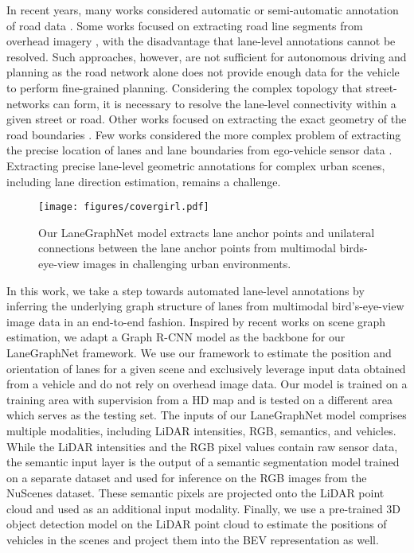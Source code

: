 \documentclass[letterpaper, 10 pt, conference]{ieeeconf}
\begin{document}
In recent years, many works considered automatic or semi-automatic annotation of road data \cite{bastani2018roadtracer, batra2019improved, mattyus2017deeproadmapper, tan2020vecroad}. Some works focused on extracting road line segments from overhead imagery \cite{batra2019improved,he2020sat2graph,tan2020vecroad,van2018spacenet}, with the disadvantage that lane-level annotations cannot be resolved. Such approaches, however, are not sufficient for autonomous driving and planning as the road network alone does not provide enough data for the vehicle to perform fine-grained planning. Considering the complex topology that street-networks can form, it is necessary to resolve the lane-level connectivity within a given street or road. Other works focused on extracting the exact geometry of the road boundaries \cite{beck2014non}. Few works considered the more complex problem of extracting the precise location of lanes and lane boundaries from ego-vehicle sensor data \cite{beck2014non, homayounfar2019dagmapper, liang2019convolutional}. Extracting precise lane-level geometric annotations for complex urban scenes, including lane direction estimation, remains a challenge.


\begin{figure}
\centering
\texttt{[image: figures/covergirl.pdf]}
\caption{Our LaneGraphNet model extracts lane anchor points and unilateral connections between the lane anchor points from multimodal birds-eye-view images in challenging urban environments.}
\label{fig:covergirl}
\end{figure}



In this work, we take a step towards automated lane-level annotations by inferring the underlying graph structure of lanes from multimodal bird's-eye-view image data in an end-to-end fashion. Inspired by recent works on scene graph estimation, we adapt a Graph R-CNN \cite{yang2018graph} model as the backbone for our LaneGraphNet framework. We use our framework to estimate the position and orientation of lanes for a given scene and exclusively leverage input data obtained from a vehicle and do not rely on overhead image data. Our model is trained on a training area with supervision from a HD map and is tested on a different area which serves as the testing set. The inputs of our LaneGraphNet model comprises multiple modalities, including LiDAR intensities, RGB, semantics, and vehicles. While the LiDAR intensities and the RGB pixel values contain raw sensor data, the semantic input layer is the output of a semantic segmentation model trained on a separate dataset and used for inference on the RGB images from the NuScenes dataset. These semantic pixels are projected onto the LiDAR point cloud and used as an additional input modality. Finally, we use a pre-trained 3D object detection model on the LiDAR point cloud to estimate the positions of vehicles in the scenes and project them into the BEV representation as well. 
\end{document}
